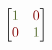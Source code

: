 \documentclass[border=5mm,preview]{standalone}
\begin{document}
\color{Silver}
\[
\begin{bmatrix}
\color{DarkOliveGreen}1 & \color{Maroon}0\\
\color{Maroon}0 & \color{DarkOliveGreen}1
\end{bmatrix}
\]
\end{document}
